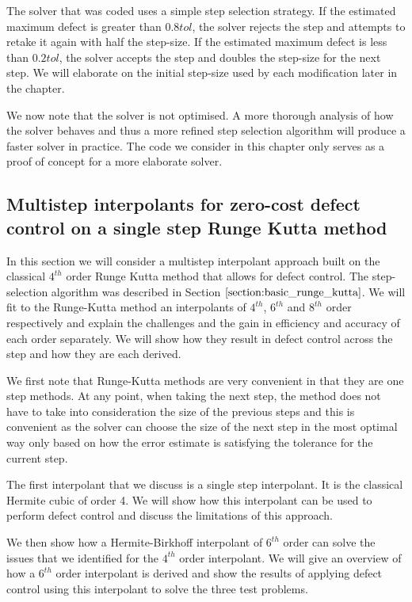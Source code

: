 \documentclass{article}
\begin{document}
The solver that was coded uses a simple step selection strategy. If the estimated maximum defect is greater than $0.8tol$, the solver rejects the step and attempts to retake it again with half the step-size. If the estimated maximum defect is less than $0.2tol$, the solver accepts the step and doubles the step-size for the next step. We will elaborate on the initial step-size used by each modification later in the chapter.

We now note that the solver is not optimised. A more thorough analysis of how the solver behaves and thus a more refined step selection algorithm will produce a faster solver in practice. The code we consider in this chapter only serves as a proof of concept for a more elaborate solver. 

\subsection{Multistep interpolants for zero-cost defect control on a single step Runge Kutta method}
\label{section:equipping_rk4_with_HBs}
In this section we will consider a multistep interpolant approach built on the classical $4^{th}$ order Runge Kutta method that allows for defect control. The step-selection algorithm was described in Section $\ref{section:basic_runge_kutta}$. We will fit to the Runge-Kutta method an interpolants of $4^{th}$, $6^{th}$ and $8^{th}$ order respectively and explain the challenges and the gain in efficiency and accuracy of each order separately. We will show how they result in defect control across the step and how they are each derived.

We first note that Runge-Kutta methods are very convenient in that they are one step methods. At any point, when taking the next step, the method does not have to take into consideration the size of the previous steps and this is convenient as the solver can choose the size of the next step in the most optimal way only based on how the error estimate is satisfying the tolerance for the current step. 

The first interpolant that we discuss is a single step interpolant. It is the classical Hermite cubic of order 4. We will show how this interpolant can be used to perform defect control and discuss the limitations of this approach. 

We then show how a Hermite-Birkhoff interpolant of $6^{th}$ order can solve the issues that we identified for the $4^{th}$ order interpolant. We will give an overview of how a $6^{th}$ order interpolant is derived and show the results of applying defect control using this interpolant to solve the three test problems. 
\end{document}

